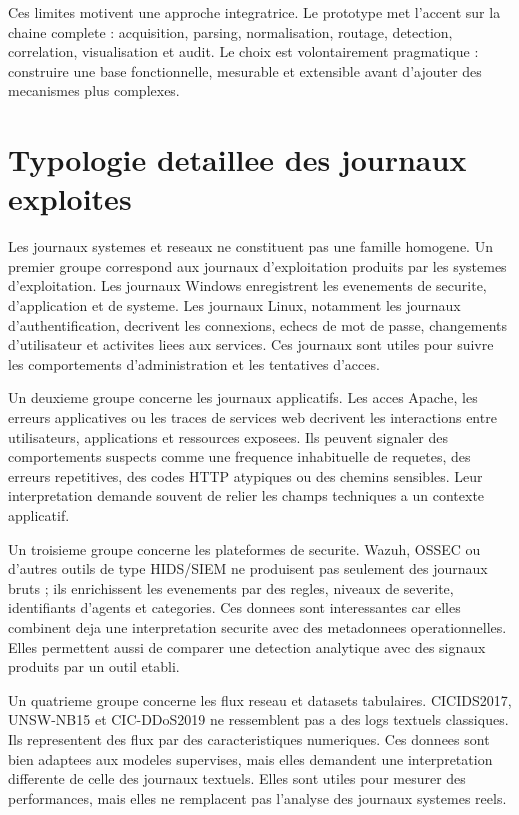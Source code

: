 Ces limites motivent une approche integratrice. Le prototype met l'accent sur la chaine complete : acquisition, parsing, normalisation, routage, detection, correlation, visualisation et audit. Le choix est volontairement pragmatique : construire une base fonctionnelle, mesurable et extensible avant d'ajouter des mecanismes plus complexes.

\section{Typologie detaillee des journaux exploites}
Les journaux systemes et reseaux ne constituent pas une famille homogene. Un premier groupe correspond aux journaux d'exploitation produits par les systemes d'exploitation. Les journaux Windows enregistrent les evenements de securite, d'application et de systeme. Les journaux Linux, notamment les journaux d'authentification, decrivent les connexions, echecs de mot de passe, changements d'utilisateur et activites liees aux services. Ces journaux sont utiles pour suivre les comportements d'administration et les tentatives d'acces.

Un deuxieme groupe concerne les journaux applicatifs. Les acces Apache, les erreurs applicatives ou les traces de services web decrivent les interactions entre utilisateurs, applications et ressources exposees. Ils peuvent signaler des comportements suspects comme une frequence inhabituelle de requetes, des erreurs repetitives, des codes HTTP atypiques ou des chemins sensibles. Leur interpretation demande souvent de relier les champs techniques a un contexte applicatif.

Un troisieme groupe concerne les plateformes de securite. Wazuh, OSSEC ou d'autres outils de type HIDS/SIEM ne produisent pas seulement des journaux bruts ; ils enrichissent les evenements par des regles, niveaux de severite, identifiants d'agents et categories. Ces donnees sont interessantes car elles combinent deja une interpretation securite avec des metadonnees operationnelles. Elles permettent aussi de comparer une detection analytique avec des signaux produits par un outil etabli.

Un quatrieme groupe concerne les flux reseau et datasets tabulaires. CICIDS2017, UNSW-NB15 et CIC-DDoS2019 ne ressemblent pas a des logs textuels classiques. Ils representent des flux par des caracteristiques numeriques. Ces donnees sont bien adaptees aux modeles supervises, mais elles demandent une interpretation differente de celle des journaux textuels. Elles sont utiles pour mesurer des performances, mais elles ne remplacent pas l'analyse des journaux systemes reels.

